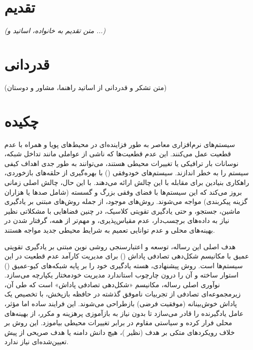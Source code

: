 \documentclass[12pt,a4paper]{report} %
\begin{document}
\chapter*{تقدیم}
\begin{center}
    \textit{(متن تقدیم به خانواده، اساتید و ...)}
\end{center}
\newpage

\chapter*{قدردانی}
(متن تشکر و قدردانی از اساتید راهنما، مشاور و دوستان)
\newpage

\chapter*{چکیده}

سیستم‌های نرم‌افزاری معاصر به طور فزاینده‌ای در محیط‌های پویا و همراه با عدم قطعیت عمل می‌کنند. این عدم قطعیت‌ها که ناشی از عواملی مانند تداخل شبکه، نوسانات بار ترافیکی یا تغییرات محیطی هستند، می‌توانند به طور جدی اهداف کیفی سیستم را به خطر اندازند. سیستم‌های خودوفقی () با بهره‌گیری از حلقه‌های بازخوردی، راهکاری بنیادین برای مقابله با این چالش ارائه می‌دهند. با این حال، چالش اصلی زمانی بروز می‌کند که این سیستم‌ها با فضای وفقی بزرگ و گسسته (شامل صدها یا هزاران گزینه پیکربندی) مواجه می‌شوند. روش‌های موجود، از جمله روش‌های مبتنی بر یادگیری ماشین، جستجو، و حتی یادگیری تقویتی کلاسیک، در چنین فضاهایی با مشکلاتی نظیر نیاز به داده‌های برچسب‌دار، عدم مقیاس‌پذیری، و مهم‌تر از همه، گرفتار شدن در بهینه‌های محلی و عدم توانایی تعمیم به شرایط محیطی جدید مواجه هستند.

هدف اصلی این رساله، توسعه و اعتبارسنجی روشی نوین مبتنی بر یادگیری تقویتی عمیق با مکانیسم شکل‌دهی تصادفی پاداش () برای مدیریت کارآمد عدم قطعیت در این سیستم‌ها است. روش پیشنهادی، هسته یادگیری خود را بر پایه شبکه‌های کیو-عمیق () استوار ساخته و آن را درون چارچوب استاندارد مدیریت خودمختار  یکپارچه می‌سازد. نوآوری اصلی رساله، مکانیسم «شکل‌دهی تصادفی پاداش» است که طی آن، زیرمجموعه‌ای تصادفی از تجربیات ناموفق گذشته در حافظه بازپخش، با تخصیص یک پاداش خوش‌بینانه (موفقیت فرضی) بازطراحی می‌شوند. این فرایند ساده اما مؤثر، عامل یادگیرنده را قادر می‌سازد تا بدون نیاز به بازآموزی پرهزینه و مکرر، از بهینه‌های محلی فرار کرده و سیاستی مقاوم در برابر تغییرات محیطی بیاموزد. این روش بر خلاف رویکردهای متکی بر هدف (نظیر )، هیچ دانش دامنه یا هدف صریحی از پیش تعیین‌شده‌ای نیاز ندارد.
\end{document}
